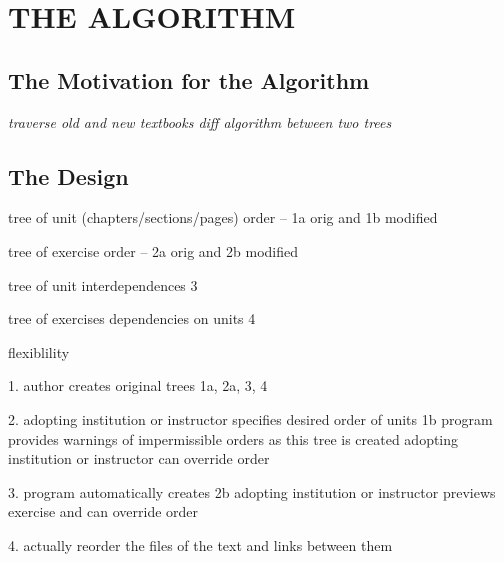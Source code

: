 %
%
%
%


\chapter{THE ALGORITHM}

\section{The Motivation for the Algorithm}

\textit{traverse old and new textbooks
diff algorithm between two trees}


\section{The Design}

 
tree of unit (chapters/sections/pages) order -- 1a orig and 1b modified

tree of exercise order -- 2a orig and 2b modified

tree of unit interdependences 3

tree of exercises dependencies on units 4

flexiblility 

1. author creates original trees 1a, 2a, 3, 4

2. adopting institution or instructor specifies desired order of units 1b \newline
   program provides warnings of impermissible orders as this tree is created \newline
   adopting institution or instructor can override order
   
3. program automatically creates 2b \newline
   adopting institution or instructor previews exercise and can override order
   
4. actually reorder the files of the text and links between them


